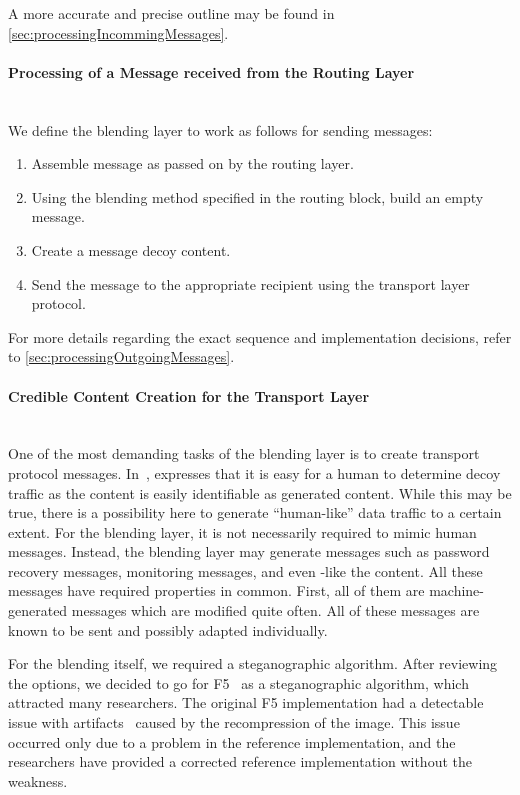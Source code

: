 A more accurate and precise outline may be found in \cref{sec:processingIncommingMessages}.

\paragraph{Processing of a Message received from the Routing Layer}~\\
We define the blending layer to work as follows for sending messages:
\begin{enumerate}
	\item Assemble message as passed on by the routing layer.
	\item Using the blending method specified in the routing block, build an empty message. 
	\item Create a message decoy content.
	\item Send the message to the appropriate recipient using the transport layer protocol.
\end{enumerate}

For more details regarding the exact sequence and implementation decisions, refer to \cref{sec:processingOutgoingMessages}.

\paragraph{Credible Content Creation for the Transport Layer}~\\
One of the most demanding tasks of the blending layer is to create transport protocol messages. In~\cite{oakland2013-parrot}, \citeauthor{oakland2013-parrot} expresses that it is easy for a human to determine decoy traffic as the content is easily identifiable as generated content. While this may be true, there is a possibility here to generate ``human-like'' data traffic to a certain extent. For the blending layer, it is not necessarily required to mimic human messages. Instead, the blending layer may generate messages such as password recovery messages, monitoring messages, and even -like the content. All these messages have required properties in common. First, all of them are machine-generated messages which are modified quite often. All of these messages are known to be sent and possibly adapted individually. 

For the blending itself, we required a steganographic algorithm. After reviewing the options, we decided to go for F5~\cite{f5} as a steganographic algorithm, which attracted many researchers. The original F5 implementation had a detectable issue with artifacts~\cite{F5broken} caused by the recompression of the image. This issue occurred only due to a problem in the reference implementation, and the researchers have provided a corrected reference implementation without the weakness.

